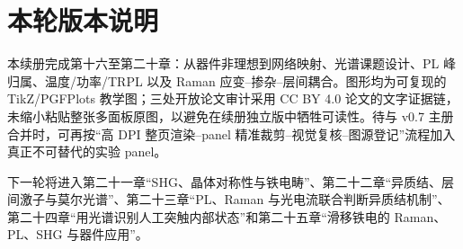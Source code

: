 \documentclass[11pt,a4paper,openany,fontset=fandol]{ctexbook}
\begin{document}
\chapter*{本轮版本说明}
本续册完成第十六至第二十章：从器件非理想到网络映射、光谱课题设计、PL 峰归属、温度/功率/TRPL 以及 Raman 应变--掺杂--层间耦合。图形均为可复现的 TikZ/PGFPlots 教学图；三处开放论文审计采用 CC BY 4.0 论文的文字证据链，未缩小粘贴整张多面板原图，以避免在续册独立版中牺牲可读性。待与 v0.7 主册合并时，可再按“高 DPI 整页渲染--panel 精准裁剪--视觉复核--图源登记”流程加入真正不可替代的实验 panel。

下一轮将进入第二十一章“SHG、晶体对称性与铁电畴”、第二十二章“异质结、层间激子与莫尔光谱”、第二十三章“PL、Raman 与光电流联合判断异质结机制”、第二十四章“用光谱识别人工突触内部状态”和第二十五章“滑移铁电的 Raman、PL、SHG 与器件应用”。
\end{document}
